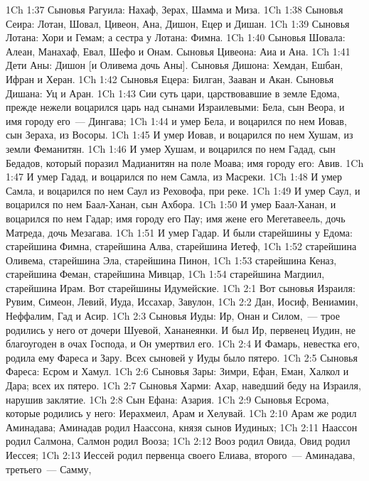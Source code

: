 \vs 1Ch 1:37 Сыновья Рагуила: Нахаф, Зерах, Шамма и Миза.
\vs 1Ch 1:38 Сыновья Сеира: Лотан, Шовал, Цивеон, Ана, Дишон, Ецер и Дишан.
\vs 1Ch 1:39 Сыновья Лотана: Хори и Гемам; а сестра у Лотана: Фимна.
\vs 1Ch 1:40 Сыновья Шовала: Алеан, Манахаф, Евал, Шефо и Онам. Сыновья Цивеона: Аиа и Ана.
\vs 1Ch 1:41 Дети Аны: Дишон [и Оливема дочь Аны]. Сыновья Дишона: Хемдан, Ешбан, Ифран и Херан.
\vs 1Ch 1:42 Сыновья Ецера: Билган, Зааван и Акан. Сыновья Дишана: Уц и Аран.
\rsbpar\vs 1Ch 1:43 Сии суть цари, царствовавшие в земле Едома, прежде нежели воцарился царь над сынами Израилевыми: Бела, сын Веора, и имя городу его~--- Дингава;
\vs 1Ch 1:44 и умер Бела, и воцарился по нем Иовав, сын Зераха, из Восоры.
\vs 1Ch 1:45 И умер Иовав, и воцарился по нем Хушам, из земли Феманитян.
\vs 1Ch 1:46 И умер Хушам, и воцарился по нем Гадад, сын Бедадов, который поразил Мадианитян на поле Моава; имя городу его: Авив.
\vs 1Ch 1:47 И умер Гадад, и воцарился по нем Самла, из Масреки.
\vs 1Ch 1:48 И умер Самла, и воцарился по нем Саул из Реховофа,  при реке.
\vs 1Ch 1:49 И умер Саул, и воцарился по нем Баал-Ханан, сын Ахбора.
\vs 1Ch 1:50 И умер Баал-Ханан, и воцарился по нем Гадар; имя городу его Пау; имя жене его Мегетавеель, дочь Матреда, дочь Мезагава.
\rsbpar\vs 1Ch 1:51 И умер Гадар. И были старейшины у Едома: старейшина Фимна, старейшина Алва, старейшина Иетеф,
\vs 1Ch 1:52 старейшина Оливема, старейшина Эла, старейшина Пинон,
\vs 1Ch 1:53 старейшина Кеназ, старейшина Феман, старейшина Мивцар,
\vs 1Ch 1:54 старейшина Магдиил, старейшина Ирам. Вот старейшины Идумейские.
\vs 1Ch 2:1 Вот сыновья Израиля: Рувим, Симеон, Левий, Иуда, Иссахар, Завулон,
\vs 1Ch 2:2 Дан, Иосиф, Вениамин, Неффалим, Гад и Асир.
\rsbpar\vs 1Ch 2:3 Сыновья Иуды: Ир, Онан и Силом,~--- трое родились у него от дочери Шуевой, Хананеянки. И был Ир, первенец Иудин, не благоугоден в очах Господа, и Он умертвил его.
\rsbpar\vs 1Ch 2:4 И Фамарь, невестка его, родила ему Фареса и Зару. Всех сыновей у Иуды было пятеро.
\vs 1Ch 2:5 Сыновья Фареса: Есром и Хамул.
\vs 1Ch 2:6 Сыновья Зары: Зимри, Ефан, Еман, Халкол и Дара; всех их пятеро.
\rsbpar\vs 1Ch 2:7 Сыновья Харми: Ахар, наведший беду на Израиля, нарушив заклятие.
\vs 1Ch 2:8 Сын Ефана: Азария.
\vs 1Ch 2:9 Сыновья Есрома, которые родились у него: Иерахмеил, Арам и Хелувай.
\rsbpar\vs 1Ch 2:10 Арам же родил Аминадава; Аминадав родил Наассона, князя сынов Иудиных;
\vs 1Ch 2:11 Наассон родил Салмона, Салмон родил Вооза;
\vs 1Ch 2:12 Вооз родил Овида, Овид родил Иессея;
\vs 1Ch 2:13 Иессей родил первенца своего Елиава, второго~--- Аминадава, третьего~--- Самму,
